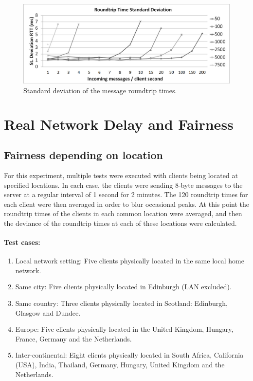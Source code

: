 \documentclass[12pt]{article}
\begin{document}
\begin{center}
\begin{figure}
\includegraphics[scale=0.32]{test_SERVER_RTTstd.jpg}
\caption{Standard deviation of the message roundtrip times.}
\end{figure}

\end{center}


\section{Real Network Delay and Fairness}

\subsection{Fairness depending on location}
For this experiment, multiple tests were executed with clients being located at specified locations. In each case, the clients were sending 8-byte messages to the server at a regular interval of 1 second for 2 minutes. The 120 roundtrip times for each client were then averaged in order to blur occasional peaks. At this point the roundtrip times of the clients in each common location were averaged, and then the deviance of the roundtrip times at each of these locations were calculated.

\paragraph{Test cases:}
\begin{enumerate}
\item Local network setting: Five clients physically located in the same local home network.

\item Same city: Five clients physically located in Edinburgh (LAN excluded).

\item Same country: Three clients physically located in Scotland: Edinburgh, Glasgow and Dundee.

\item Europe: Five clients physically located in the United Kingdom, Hungary, France, Germany and the Netherlands.

\item Inter-continental: Eight clients physically located in South Africa, California (USA), India, Thailand, Germany, Hungary, United Kingdom and the Netherlands.

\end{enumerate}
\end{document}
